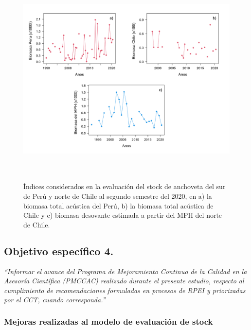 \documentclass[letter,11pt]{article}
\begin{document}
\vspace{0.5cm}
\begin{figure}[htb!]
 \centering
 \includegraphics[width=12cm,height=11cm]{Figuras/figura19.pdf}
 \caption{\'Indices considerados en la evaluaci\'on del stock de anchoveta del sur de Per\'u y norte de Chile al segundo semestre del 2020, en a) la biomasa total ac\'ustica del Per\'u, b) la biomasa total ac\'ustica de Chile y c) biomasa desovante estimada a partir del MPH del norte de Chile.}
 \label{Fig19}
\end{figure}


\clearpage
\newpage

\subsection{Objetivo espec\'ifico 4.}

\textit{\textquotedblleft Informar el avance del Programa de Mejoramiento Continuo de la Calidad en la Asesor\'ia Cient\'ifica (PMCCAC) realizado durante el presente estudio, respecto al cumplimiento de recomendaciones formuladas en procesos de RPEI y priorizadas por el CCT, cuando corresponda.\textquotedblright}
\vspace{-0.2cm}


\subsubsection{Mejoras realizadas al modelo de evaluaci\'on de stock}
\end{document}
